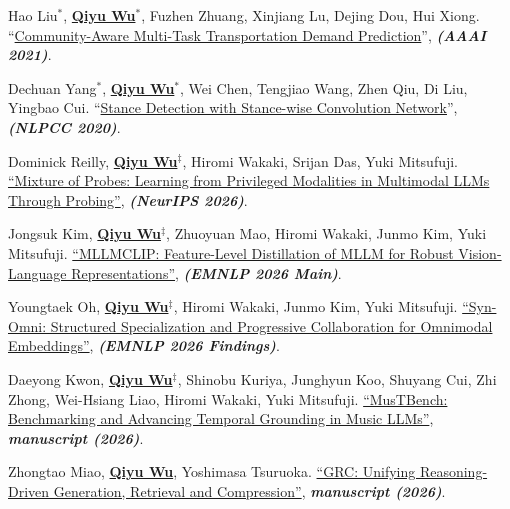 \documentclass[10pt, letterpaper]{article}
\begin{document}
\begin{description}[leftmargin=3.5em,labelwidth=3em,labelsep=0.5em,topsep=0.10cm,itemsep=0.10cm,parsep=0pt]
        \item [{[F2]}] Hao Liu$^*$, \underline{\textbf{Qiyu Wu}$^*$}, Fuzhen Zhuang, Xinjiang Lu, Dejing Dou, Hui Xiong. ``\href{https://ojs.aaai.org/index.php/AAAI/article/view/16107}{Community-Aware Multi-Task Transportation Demand Prediction}'', \textit{\textbf{(AAAI 2021)}}.
        \item [{[F1]}] Dechuan Yang$^*$, \underline{\textbf{Qiyu Wu}$^*$}, Wei Chen, Tengjiao Wang, Zhen Qiu, Di Liu, Yingbao Cui. ``\href{https://link.springer.com/chapter/10.1007/978-3-030-60450-9_44}{Stance Detection with Stance-wise Convolution Network}'', \textit{\textbf{(NLPCC 2020)}}.
      \end{description}

      \begin{description}[leftmargin=3.5em,labelwidth=3em,labelsep=0.5em,topsep=0.10cm,itemsep=0.10cm,parsep=0pt]
        \item [{[S9]}] Dominick Reilly, \underline{\textbf{Qiyu Wu}}$^{\ddagger}$, Hiromi Wakaki, Srijan Das, Yuki Mitsufuji. \href{https://arxiv.org/abs/2607.08839}{``Mixture of Probes: Learning from Privileged Modalities in Multimodal LLMs Through Probing''}, \textit{\textbf{(NeurIPS 2026)}}.
        \item [{[S8]}] Jongsuk Kim, \underline{\textbf{Qiyu Wu}}$^{\ddagger}$, Zhuoyuan Mao, Hiromi Wakaki, Junmo Kim, Yuki Mitsufuji. \href{https://arxiv.org/abs/2608.25575}{``MLLMCLIP: Feature-Level Distillation of MLLM for Robust Vision-Language Representations''}, \textit{\textbf{(EMNLP 2026 Main)}}.
        \item [{[S7]}] Youngtaek Oh, \underline{\textbf{Qiyu Wu}}$^{\ddagger}$, Hiromi Wakaki, Junmo Kim, Yuki Mitsufuji. \href{https://arxiv.org/abs/2610.12256}{``Syn-Omni: Structured Specialization and Progressive Collaboration for Omnimodal Embeddings''}, \textit{\textbf{(EMNLP 2026 Findings)}}.
        \item [{[S6]}] Daeyong Kwon, \underline{\textbf{Qiyu Wu}}$^{\ddagger}$, Shinobu Kuriya, Junghyun Koo, Shuyang Cui, Zhi Zhong, Wei-Hsiang Liao, Hiromi Wakaki, Yuki Mitsufuji. \href{https://arxiv.org/abs/2605.29300}{``MusTBench: Benchmarking and Advancing Temporal Grounding in Music LLMs''}, \textit{\textbf{manuscript (2026)}}.
        \item [{[S5]}] Zhongtao Miao, \underline{\textbf{Qiyu Wu}}, Yoshimasa Tsuruoka. \href{https://arxiv.org/abs/2605.09100}{``GRC: Unifying Reasoning-Driven Generation, Retrieval and Compression''}, \textit{\textbf{manuscript (2026)}}.

\end{description}
\end{document}

